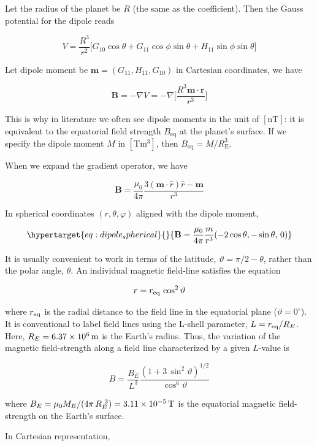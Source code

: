 \documentclass[
  notoc %
]{tufte-book}
\begin{document}
Let the radius of the planet be \(R\) (the same as the coefficient).
Then the Gauss potential for the dipole reads

\[
V = \frac{R^3}{r^2}\big[ G_{10}\cos\theta + G_{11}\cos\phi\sin\theta + H_{11}\sin\phi\sin\theta \big]
\]

Let dipole moment be \(\mathbf{m} = (G_{11},H_{11},G_{10})\) in
Cartesian coordinates, we have

\[
\mathbf{B} = -\nabla V = -\nabla \Big[ \frac{R^3\mathbf{m}\cdot\mathbf{r}}{r^3} \Big]
\]

This is why in literature we often see dipole moments in the unit of
\([\text{nT}]\): it is equivalent to the equatorial field strength
\(B_{\text{eq}}\) at the planet's surface. If we specify the dipole
moment \(M\) in \([\text{T}\text{m}^3]\), then
\(B_{\text{eq}}=M/R_\text{E}^3\).

When we expand the gradient operator, we have

\[
\mathbf{B} = \frac{\mu_0}{4\pi}\frac{3(\mathbf{m}\cdot\widehat{r})\widehat{r}-\mathbf{m}}{r^3}
\]

In spherical coordinates \((r,\theta,\varphi)\) aligned with the dipole
moment,

\begin{equation}\protect\hypertarget{eq:dipole_spherical}{}{
{\bf B} = \frac{\mu_0}{4\pi} \frac{m}{r^3} (-2\cos\theta, -\sin\theta, \,0)
}\label{eq:dipole_spherical}\end{equation}

It is usually convenient to work in terms of the latitude,
\(\vartheta = \pi/2 - \theta\), rather than the polar angle, \(\theta\).
An individual magnetic field-line satisfies the equation

\[
r = r_{\rm eq}\,\cos^2\vartheta
\]

where \(r_{\rm eq}\) is the radial distance to the field line in the
equatorial plane (\(\vartheta=0^\circ\)). It is conventional to label
field lines using the L-shell parameter, \(L=r_{\rm eq}/R_E\). Here,
\(R_E = 6.37\times 10^6\,{\rm m}\) is the Earth's radius. Thus, the
variation of the magnetic field-strength along a field line
characterized by a given \(L\)-value is

\[
B = \frac{B_E}{L^3} \frac{(1+3\,\sin^2\vartheta)^{1/2}}{\cos^6\vartheta}
\]

where \(B_E= \mu_0 M_E/(4\pi\, R_E^{~3}) = 3.11\times 10^{-5}\,{\rm T}\)
is the equatorial magnetic field-strength on the Earth's surface.

In Cartesian representation,
\end{document}
